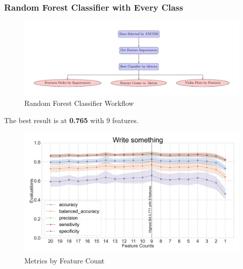 \documentclass{beamer}
\begin{document}
    \begin{frame}[allowframebreaks]
        \frametitle{Random Forest Classifier with Every Class}

        \begin{figure}
            \includegraphics[width=0.8 \linewidth]{figures/RandomForest/whole.pdf}
            \caption{Random Forest Classifier Workflow}
        \end{figure}

        The best result is at \textbf{0.765} with 9 features.

        \begin{figure}
            \includegraphics[width=0.8 \linewidth]{figures/RandomForest/ANCOM.DADA2.homd/metrics.png}
            \caption{Metrics by Feature Count}
        \end{figure}


\end{frame}
\end{document}
